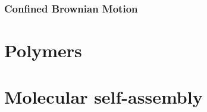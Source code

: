 \documentclass[12pt,a4paper]{article}
\begin{document}
\subsubsection{Confined Brownian Motion}

\section{Polymers}
\section{Molecular self-assembly}
\end{document}
